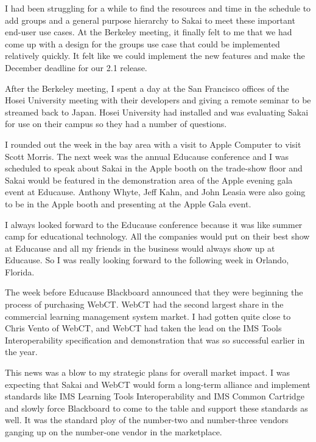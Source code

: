 \documentclass[12pt]{book}
\begin{document}
I had been struggling
for a while to find the resources and time
in the schedule to add groups and a general purpose
hierarchy to Sakai to meet these
important end-user use cases.  At the Berkeley
meeting, it finally felt to me that we had come
up with a design for the groups use case that
could be implemented relatively quickly.
It felt like we could implement the new features
and make the December deadline for our
2.1 release.

After the Berkeley meeting, I spent a day at the
San Francisco offices of the Hosei University
meeting with their developers and giving a remote seminar
to be streamed back to Japan.  Hosei University
had installed and was evaluating Sakai for use on
their campus so they had a number of questions.


I rounded out the week in the bay area with a visit
to Apple Computer to visit Scott Morris.  The next week
was the annual Educause conference and I was scheduled
to speak about Sakai in the Apple booth on the trade-show
floor and Sakai would be featured in the demonstration
area of the Apple evening gala event at Educause.
Anthony Whyte, Jeff Kahn, and John Leasia were also
going to be in the Apple booth and presenting at the
Apple Gala event.

I always looked forward to the Educause conference because
it was like summer camp for educational technology.
All the companies would put
on their best show at Educause and all my friends
in the business would always show up at Educause.  So
I was really looking forward to the following week
in Orlando, Florida.

The week before Educause
Blackboard announced that they were
beginning the process of purchasing WebCT.  WebCT had
the second largest share in the commercial
learning management system market.
I had gotten quite close to
Chris Vento of WebCT, and WebCT had taken the lead
on the IMS Tools Interoperability specification and
demonstration that was so successful earlier
in the year.

This news was a blow to my strategic plans for
overall market impact.   I was expecting that Sakai
and WebCT would form a long-term alliance and
implement standards like IMS Learning Tools Interoperability
and IMS Common Cartridge and slowly force Blackboard
to come to the table and support these standards as
well.  It was the standard ploy of the number-two and
number-three vendors ganging up on the number-one vendor
in the marketplace.
\end{document}
